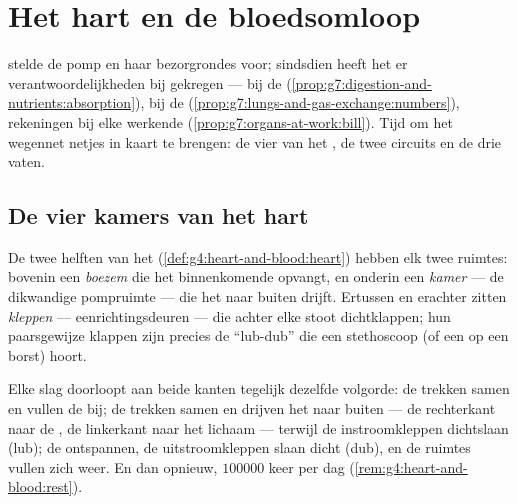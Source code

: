 \chapter{Het hart en de bloedsomloop}\label{ch:g7:heart-and-circulation}

 stelde de pomp en haar bezorgrondes voor;
sindsdien heeft het  er verantwoordelijkheden bij gekregen ---
 bij de 
(\cref{prop:g7:digestion-and-nutrients:absorption}),  bij de
 (\cref{prop:g7:lungs-and-gas-exchange:numbers}), rekeningen
bij elke werkende  (\cref{prop:g7:organs-at-work:bill}). Tijd om het
wegennet netjes in kaart te brengen: de vier  van het , de twee
circuits en de drie  vaten.

\section{De vier kamers van het hart}

\begin{definition}\label{def:g7:heart-and-circulation:rooms}
De twee helften van het  (\cref{def:g4:heart-and-blood:heart}) hebben
elk twee ruimtes: bovenin een \emph{boezem} die het
binnenkomende  opvangt, en onderin een \emph{kamer}
--- de dikwandige pompruimte --- die het naar buiten drijft. Ertussen en
erachter zitten \emph{kleppen} --- eenrichtingsdeuren
--- die achter elke stoot dichtklappen; hun paarsgewijze klappen zijn
precies de ``lub-dub'' die een stethoscoop (of een  op een borst) hoort.
\end{definition}

\begin{proposition}\label{prop:g7:heart-and-circulation:beat}
Elke slag doorloopt aan beide kanten tegelijk dezelfde volgorde: de
 trekken samen en vullen de  bij; de  trekken samen en
drijven het  naar buiten --- de rechterkant naar de , de
linkerkant naar het lichaam --- terwijl de instroomkleppen dichtslaan
(lub); de  ontspannen, de uitstroomkleppen slaan dicht (dub), en de
ruimtes vullen zich weer. En dan opnieuw, $100000$ keer per dag
(\cref{rem:g4:heart-and-blood:rest}).
\end{proposition}
\admitted

